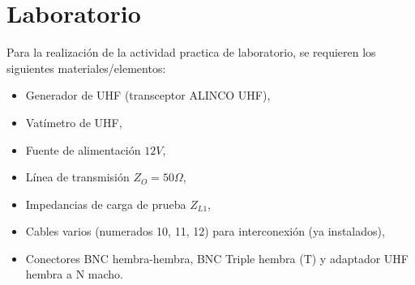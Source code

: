 \chapter{Laboratorio}
  Para la realización de la actividad practica de laboratorio, se requieren los siguientes materiales/elementos:
  \begin{itemize}
    \item Generador de UHF (transceptor ALINCO UHF),
    \item Vatímetro de UHF,
    \item Fuente de alimentación $12V$,
    \item Línea de transmisión $Z_O = 50 \Omega$,
    \item Impedancias de carga de prueba $Z_{L1}$,
    \item Cables varios (numerados 10, 11, 12) para interconexión (ya instalados),
    \item Conectores BNC hembra-hembra, BNC Triple hembra (T) y adaptador UHF hembra a N macho.
  \end{itemize}

